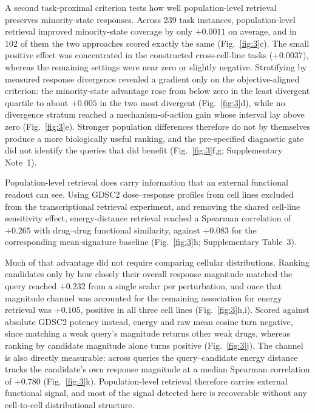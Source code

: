 \documentclass[11pt,letterpaper]{article}
\newcommand{\ENERGYFUNC}{+0.265}
\newcommand{\MEANCTRLFUNC}{+0.083}
\newcommand{\MAGMATCHFUNC}{+0.232}
\newcommand{\ENERGYPARTIAL}{+0.105}
\newcommand{\PROJMEAN}{+0.0011}
\newcommand{\ENERGYCANDMAG}{+0.780}
\begin{document}
A second task-proximal criterion tests how well population-level retrieval preserves minority-state responses. Across 239 task instances, population-level retrieval improved minority-state coverage by only $\PROJMEAN$ on average, and in 102 of them the two approaches scored exactly the same (Fig.~\ref{fig:3}c). The small positive effect was concentrated in the constructed cross-cell-line tasks ($+0.0037$), whereas the remaining settings were near zero or slightly negative. Stratifying by measured response divergence revealed a gradient only on the objective-aligned criterion: the minority-state advantage rose from below zero in the least divergent quartile to about $+0.005$ in the two most divergent (Fig.~\ref{fig:3}d), while no divergence stratum reached a mechanism-of-action gain whose interval lay above zero (Fig.~\ref{fig:3}e). Stronger population differences therefore do not by themselves produce a more biologically useful ranking, and the pre-specified diagnostic gate did not identify the queries that did benefit (Fig.~\ref{fig:3}f,g; Supplementary Note~1).

Population-level retrieval does carry information that an external functional readout can see. Using GDSC2\cite{GDSC,GDSCLandscape} dose--response profiles from cell lines excluded from the transcriptional retrieval experiment, and removing the shared cell-line sensitivity effect, energy-distance retrieval reached a Spearman correlation of $\ENERGYFUNC$ with drug--drug functional similarity, against $\MEANCTRLFUNC$ for the corresponding mean-signature baseline (Fig.~\ref{fig:3}h; Supplementary Table~3).

Much of that advantage did not require comparing cellular distributions. Ranking candidates only by how closely their overall response magnitude matched the query reached $\MAGMATCHFUNC$ from a single scalar per perturbation, and once that magnitude channel was accounted for the remaining association for energy retrieval was $\ENERGYPARTIAL$, positive in all three cell lines (Fig.~\ref{fig:3}h,i). Scored against absolute GDSC2 potency instead, energy and raw mean cosine turn negative, since matching a weak query's magnitude returns other weak drugs, whereas ranking by candidate magnitude alone turns positive (Fig.~\ref{fig:3}j). The channel is also directly measurable: across queries the query--candidate energy distance tracks the candidate's own response magnitude at a median Spearman correlation of $\ENERGYCANDMAG$ (Fig.~\ref{fig:3}k). Population-level retrieval therefore carries external functional signal, and most of the signal detected here is recoverable without any cell-to-cell distributional structure.
\end{document}

